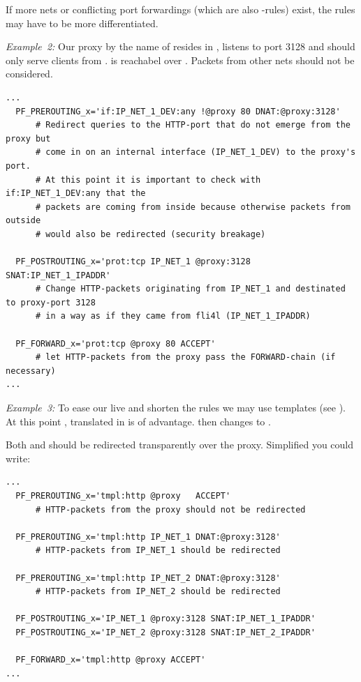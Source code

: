 If more nets or conflicting port forwardings (which are also -rules)
exist, the rules may have to be more differentiated.

\emph{Example~2:} Our proxy by the name of  resides in ,
listens to port 3128 and should only serve clients from . 
 is reachabel over . Packets from other nets
should not be considered.

\begin{example}
\begin{verbatim}
...
  PF_PREROUTING_x='if:IP_NET_1_DEV:any !@proxy 80 DNAT:@proxy:3128'
      # Redirect queries to the HTTP-port that do not emerge from the proxy but
      # come in on an internal interface (IP_NET_1_DEV) to the proxy's port.
      # At this point it is important to check with if:IP_NET_1_DEV:any that the 
      # packets are coming from inside because otherwise packets from outside 
      # would also be redirected (security breakage)

  PF_POSTROUTING_x='prot:tcp IP_NET_1 @proxy:3128 SNAT:IP_NET_1_IPADDR'
      # Change HTTP-packets originating from IP_NET_1 and destinated to proxy-port 3128
      # in a way as if they came from fli4l (IP_NET_1_IPADDR)

  PF_FORWARD_x='prot:tcp @proxy 80 ACCEPT'
      # let HTTP-packets from the proxy pass the FORWARD-chain (if necessary)
...
\end{verbatim}
\end{example}

\emph{Example~3:} To ease our live and shorten the rules we may use
templates (see ).
At this point , translated in 
is of advantage.  then changes
to .

Both  and  should be redirected transparently
over the proxy. Simplified you could write:

\begin{example}
\begin{verbatim}
...
  PF_PREROUTING_x='tmpl:http @proxy   ACCEPT'
      # HTTP-packets from the proxy should not be redirected

  PF_PREROUTING_x='tmpl:http IP_NET_1 DNAT:@proxy:3128'
      # HTTP-packets from IP_NET_1 should be redirected

  PF_PREROUTING_x='tmpl:http IP_NET_2 DNAT:@proxy:3128'
      # HTTP-packets from IP_NET_2 should be redirected

  PF_POSTROUTING_x='IP_NET_1 @proxy:3128 SNAT:IP_NET_1_IPADDR'
  PF_POSTROUTING_x='IP_NET_2 @proxy:3128 SNAT:IP_NET_2_IPADDR'

  PF_FORWARD_x='tmpl:http @proxy ACCEPT'
...
\end{verbatim}
\end{example}

